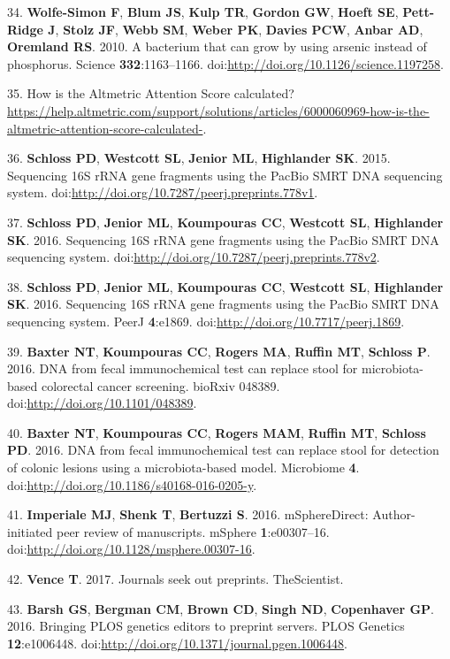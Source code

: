 \documentclass[11pt,]{article}
\begin{document}
34. \textbf{Wolfe-Simon F}, \textbf{Blum JS}, \textbf{Kulp TR},
\textbf{Gordon GW}, \textbf{Hoeft SE}, \textbf{Pett-Ridge J},
\textbf{Stolz JF}, \textbf{Webb SM}, \textbf{Weber PK}, \textbf{Davies
PCW}, \textbf{Anbar AD}, \textbf{Oremland RS}. 2010. A bacterium that
can grow by using arsenic instead of phosphorus. Science
\textbf{332}:1163--1166.
doi:\url{http://doi.org/10.1126/science.1197258}.

35. How is the Altmetric Attention Score calculated?
\url{https://help.altmetric.com/support/solutions/articles/6000060969-how-is-the-altmetric-attention-score-calculated-}.

36. \textbf{Schloss PD}, \textbf{Westcott SL}, \textbf{Jenior ML},
\textbf{Highlander SK}. 2015. Sequencing 16S rRNA gene fragments using
the PacBio SMRT DNA sequencing system.
doi:\url{http://doi.org/10.7287/peerj.preprints.778v1}.

37. \textbf{Schloss PD}, \textbf{Jenior ML}, \textbf{Koumpouras CC},
\textbf{Westcott SL}, \textbf{Highlander SK}. 2016. Sequencing 16S rRNA
gene fragments using the PacBio SMRT DNA sequencing system.
doi:\url{http://doi.org/10.7287/peerj.preprints.778v2}.

38. \textbf{Schloss PD}, \textbf{Jenior ML}, \textbf{Koumpouras CC},
\textbf{Westcott SL}, \textbf{Highlander SK}. 2016. Sequencing 16S rRNA
gene fragments using the PacBio SMRT DNA sequencing system. PeerJ
\textbf{4}:e1869. doi:\url{http://doi.org/10.7717/peerj.1869}.

39. \textbf{Baxter NT}, \textbf{Koumpouras CC}, \textbf{Rogers MA},
\textbf{Ruffin MT}, \textbf{Schloss P}. 2016. DNA from fecal
immunochemical test can replace stool for microbiota-based colorectal
cancer screening. bioRxiv 048389.
doi:\url{http://doi.org/10.1101/048389}.

40. \textbf{Baxter NT}, \textbf{Koumpouras CC}, \textbf{Rogers MAM},
\textbf{Ruffin MT}, \textbf{Schloss PD}. 2016. DNA from fecal
immunochemical test can replace stool for detection of colonic lesions
using a microbiota-based model. Microbiome \textbf{4}.
doi:\url{http://doi.org/10.1186/s40168-016-0205-y}.

41. \textbf{Imperiale MJ}, \textbf{Shenk T}, \textbf{Bertuzzi S}. 2016.
mSphereDirect: Author-initiated peer review of manuscripts. mSphere
\textbf{1}:e00307--16.
doi:\url{http://doi.org/10.1128/msphere.00307-16}.

42. \textbf{Vence T}. 2017. Journals seek out preprints. TheScientist.

43. \textbf{Barsh GS}, \textbf{Bergman CM}, \textbf{Brown CD},
\textbf{Singh ND}, \textbf{Copenhaver GP}. 2016. Bringing PLOS genetics
editors to preprint servers. PLOS Genetics \textbf{12}:e1006448.
doi:\url{http://doi.org/10.1371/journal.pgen.1006448}.
\end{document}
